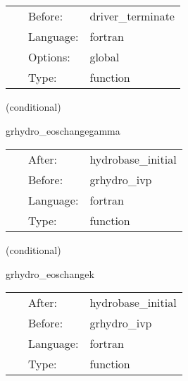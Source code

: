 \documentclass{article}
\begin{document}
\hspace{5mm}{\it deallocate weno coefficients } 


\hspace{5mm}

 \begin{tabular*}{160mm}{cll} 
~ & Before:  & driver\_terminate \\ 
~ & Language:  & fortran \\ 
~ & Options:  & global \\ 
~ & Type:  & function \\ 
\end{tabular*} 


\vspace{5mm}

   (conditional) 

\hspace{5mm} grhydro\_eoschangegamma 

\hspace{5mm}{\it reset the specific internal energy if the eos changes between id and evolution } 


\hspace{5mm}

 \begin{tabular*}{160mm}{cll} 
~ & After:  & hydrobase\_initial \\ 
~ & Before:  & grhydro\_ivp \\ 
~ & Language:  & fortran \\ 
~ & Type:  & function \\ 
\end{tabular*} 


\vspace{5mm}

   (conditional) 

\hspace{5mm} grhydro\_eoschangek 

\hspace{5mm}{\it reset the hydro variables if the eos (k) changes between id and evolution } 


\hspace{5mm}

 \begin{tabular*}{160mm}{cll} 
~ & After:  & hydrobase\_initial \\ 
~ & Before:  & grhydro\_ivp \\ 
~ & Language:  & fortran \\ 
~ & Type:  & function \\ 
\end{tabular*} 
\end{document}
